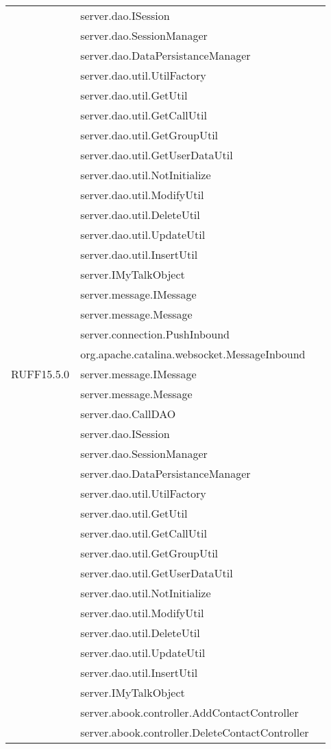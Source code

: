 \begin{center}
\begin{longtable}{lp{}l}
& server.dao.ISession\\
& server.dao.SessionManager\\
& server.dao.DataPersistanceManager\\
& server.dao.util.UtilFactory\\
& server.dao.util.GetUtil\\
& server.dao.util.GetCallUtil\\
& server.dao.util.GetGroupUtil\\
& server.dao.util.GetUserDataUtil\\
& server.dao.util.NotInitialize\\
& server.dao.util.ModifyUtil\\
& server.dao.util.DeleteUtil\\
& server.dao.util.UpdateUtil\\
& server.dao.util.InsertUtil\\
& server.IMyTalkObject\\
& server.message.IMessage\\
& server.message.Message\\
 & server.connection.PushInbound\\
& org.apache.catalina.websocket.MessageInbound\\
RUFF15.5.0 & server.message.IMessage\\
& server.message.Message\\
 & server.dao.CallDAO\\
& server.dao.ISession\\
& server.dao.SessionManager\\
& server.dao.DataPersistanceManager\\
& server.dao.util.UtilFactory\\
& server.dao.util.GetUtil\\
& server.dao.util.GetCallUtil\\
& server.dao.util.GetGroupUtil\\
& server.dao.util.GetUserDataUtil\\
& server.dao.util.NotInitialize\\
& server.dao.util.ModifyUtil\\
& server.dao.util.DeleteUtil\\
& server.dao.util.UpdateUtil\\
& server.dao.util.InsertUtil\\
& server.IMyTalkObject\\
& server.abook.controller.AddContactController\\
& server.abook.controller.DeleteContactController\\

\end{longtable}
\end{center}
